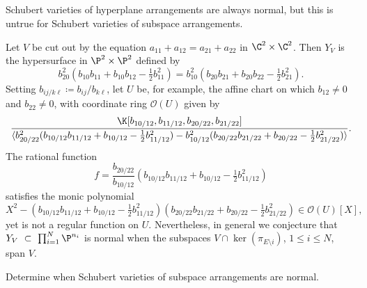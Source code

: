 \subsection{} Schubert varieties of hyperplane arrangements are always normal, but this is untrue for Schubert varieties of subspace arrangements.
\begin{exam}\label{zb:nonnormal}
  Let $V$ be cut out by the equation $a_{11} + a_{12} = a_{21} + a_{22}$ in $\C^2 \times \C^2$.
  Then $Y_V$ is the hypersurface in $\P^2 \times \P^2$ defined by
  \[
    b_{20}^2( b_{10}b_{11} + b_{10}b_{12} - \tfrac{1}{2} b_{11}^2)
    = b_{10}^2 (b_{20} b_{21} + b_{20} b_{22} - \tfrac12 b_{21}^2).
  \]
  Setting $b_{ij/k\ell} \coloneqq b_{ij} / b_{k\ell}$, let $U$ be, for example, the affine chart on which $b_{12} \neq 0$ and $b_{22} \neq 0$, with coordinate ring $\mathcal O(U)$ given by
  \[
    \frac{\K[b_{10/12}, b_{11/12}, b_{20/22}, b_{21/22}]}
    {\langle b_{20/22}^2(b_{10/12} b_{11/12} + b_{10/12} - \tfrac12 b_{11/12}^2) - b_{10/12}^2(b_{20/22}b_{21/22} + b_{20/22} - \tfrac12 b_{21/22}^2) \rangle}.
  \]
  The rational function
  \[
    f = \frac{b_{20/22}}{b_{10/12}} ( b_{10/12}b_{11/12} + b_{10/12} - \tfrac{1}{2} b_{11/12}^2)
  \]
  satisfies the monic polynomial
  \[ X^2 - ( b_{10/12}b_{11/12} + b_{10/12} - \tfrac{1}{2} b_{11/12}^2)(b_{20/22} b_{21/22} + b_{20/22} - \tfrac12 b_{21/22}^2) \in \mathcal O(U)[X], \]
  yet is not a regular function on $U$. 
  Nevertheless, in general we conjecture that $Y_V~\subset~\prod_{i=1}^N \P^{n_i}$ is normal when the subspaces $V \cap \ker(\pi_{E \setminus i})$, $1 \leq i \leq N$, span $V$.
\end{exam}
\begin{ques}
  Determine when Schubert varieties of subspace arrangements are normal.
\end{ques}



